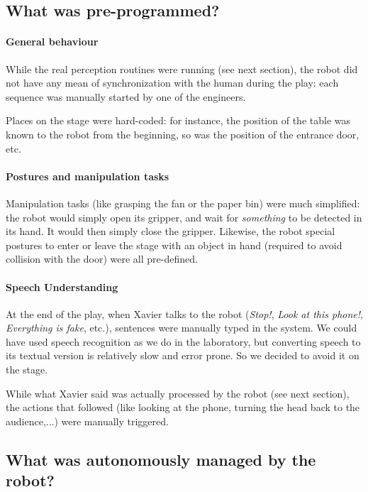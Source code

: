 \subsection{What was pre-programmed?}

\paragraph{General behaviour} While the real perception routines were running
(see next section), the robot did not have any mean of synchronization with the
human during the play: each sequence was manually started by one of the
engineers.

Places on the stage were hard-coded: for instance, the position of the table
was known to the robot from the beginning, so was the position of the entrance
door, etc.

\paragraph{Postures and manipulation tasks} Manipulation tasks (like grasping
the fan or the paper bin) were much simplified: the robot would simply open its
gripper, and wait for \emph{something} to be detected in its hand. It would
then simply close the gripper. Likewise, the robot special postures to enter or
leave the stage with an object in hand (required to avoid collision with the
door) were all pre-defined.

\paragraph{Speech Understanding} At the end of the play, when Xavier talks to
the robot (\emph{Stop!}, \emph{Look at this phone!}, \emph{Everything is fake},
etc.), sentences were manually typed in the system. We could have used speech
recognition as we do in the laboratory, but converting speech to its textual
version is relatively slow and error prone. So we decided to avoid it on the
stage.

While what Xavier said was actually processed by the robot (see next section),
the actions that followed (like looking at the phone, turning the head back to
the audience,...) were manually triggered.

\subsection{What was autonomously managed by the robot?}

